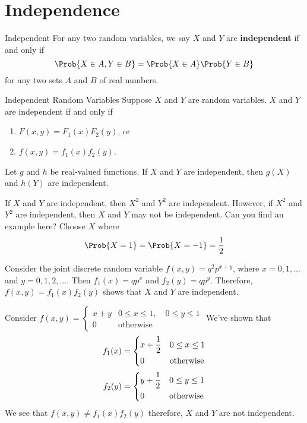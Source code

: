 \section{Independence}
\begin{Definition}{Independent}{}
    For any two random variables, we say $ X $ and $ Y $
    are \textbf{independent} if and only if
    \[ \Prob{X\in A,Y\in B}=\Prob{X\in A} \Prob{Y\in B} \]
    for any two sets $ A $ and $ B $ of real numbers.
\end{Definition}

\begin{Theorem}{Independent Random Variables}{}
    Suppose $ X $ and $ Y $ are random variables. $ X $
    and $ Y $ are independent if and only if
    \begin{enumerate}[label=(\arabic*)]
        \item $ F(x,y)=F_1(x)F_2(y) $, or
        \item $ f(x,y)=f_1(x)f_2(y) $.
    \end{enumerate}
\end{Theorem}

\begin{Theorem}{}{}
    Let $ g $ and $ h $ be real-valued functions.
    If $ X $ and $ Y $ are independent,
    then $ g(X) $ and $ h(Y) $ are independent.
\end{Theorem}

\begin{Example}{}{}
    If $ X $ and $ Y $ are independent,
    then $ X^2 $ and $ Y^2 $ are independent. However,
    if $ X^2 $ and $ Y^2 $ are independent, then $ X $
    and $ Y $ may not be independent. Can you find an example here?
    Choose $ X $ where
    \[ \Prob{X=1}
        =\Prob{X=-1}=\frac{1}{2} \]
\end{Example}

\begin{Example}{}{}
    Consider the joint discrete random variable
    $ f(x,y)=q^2 p^{x+y} $, where $ x=0,1,\ldots $
    and $ y=0,1,2,\ldots $. Then $ f_1(x)=qp^x $
    and $ f_2(y)=qp^y $. Therefore,
    $ f(x,y)=f_1(x)f_2(y) $
    shows that $ X $ and $ Y $ are independent.

    Consider $ \displaystyle
        f(x,y)=\begin{cases}
            x+y & 0\le x\le 1,\quad 0\le y\le 1 \\
            0   & \text{otherwise}
        \end{cases} $
    We've shown that
    \[ f_1(x)=\begin{dcases}
            x+\frac{1}{2} & 0\le x\le 1      \\
            0             & \text{otherwise}
        \end{dcases} \]
    \[ f_2(y)=\begin{dcases}
            y+\frac{1}{2} & 0\le y\le 1      \\
            0             & \text{otherwise}
        \end{dcases} \]
    We see that $ f(x,y)\neq f_1(x)f_2(y) $
    therefore, $ X $ and $ Y $ are not independent.
\end{Example}

